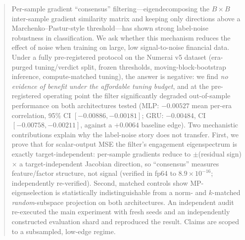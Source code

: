 \begin{abstract}
Per-sample gradient ``consensus'' filtering---eigendecomposing the $B \times
B$ inter-sample gradient similarity matrix and keeping only directions above
a Marchenko--Pastur-style threshold---has shown strong label-noise robustness
in classification. We ask whether this mechanism reduces the effect of noise
when training on large, low signal-to-noise financial data. Under a fully
pre-registered protocol on the Numerai v5 dataset (era-purged
tuning/verdict split, frozen thresholds, moving-block-bootstrap inference,
compute-matched tuning), the answer is negative: we find \emph{no evidence of
benefit under the affordable tuning budget}, and at the pre-registered
operating point the filter significantly degraded out-of-sample performance
on both architectures tested (MLP: $-0.00527$ mean per-era correlation, 95\%
CI $[-0.00886, -0.00181]$; GRU: $-0.00484$, CI $[-0.00758, -0.00211]$,
against a $+0.0064$ baseline edge). Two mechanistic contributions explain why
the label-noise story does not transfer. First, we prove that for
scalar-output MSE the filter's engagement eigenspectrum is exactly
target-independent: per-sample gradients reduce to $\pm$(residual sign)
$\times$ a target-independent Jacobian direction, so ``consensus'' measures
feature/factor structure, not signal (verified in fp64 to $8.9 \times
10^{-16}$; independently re-verified). Second, matched controls show
MP-eigenselection is statistically indistinguishable from a norm- and
$k$-matched \emph{random}-subspace projection on both architectures. An
independent audit re-executed the main experiment with fresh seeds and an
independently constructed evaluation shard and reproduced the result. Claims
are scoped to a subsampled, low-edge regime.
\end{abstract}
